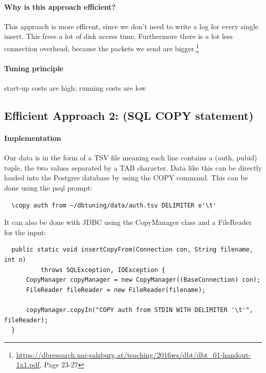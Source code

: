\documentclass[11pt]{scrartcl}
\begin{document}
  \paragraph{Why is this approach efficient?}

  This approach is more efficent, since we don't need to write a log for every single insert. This frees a lot of disk access time. Furthermore there is a lot less connection overhead, because the packets we send are bigger.\footnote{\url{https://dbresearch.uni-salzburg.at/teaching/2016ws/dbt/dbt_01-handout-1x1.pdf}, Page 23-27}

  \paragraph{Tuning principle}

  start-up costs are high; running costs are low

    \subsection*{Efficient Approach 2: (SQL COPY statement)}

  \paragraph{Implementation}

  Our data is in the form of a TSV file meaning each line contains a
  (auth, pubid) tuple, the two values separated by a TAB character. Data like this can be
  directly loaded into the Postgres database by using the COPY command. This can be
  done using the psql prompt:
  
  {\small
\begin{verbatim}
  \copy auth from ~/dbtuning/data/auth.tsv DELIMITER e'\t'
\end{verbatim}
}

It can also be done with JDBC using the CopyManager class and a FileReader
for the input:

{\small
\begin{verbatim}
  public static void insertCopyFrom(Connection con, String filename, int n)
          throws SQLException, IOException {
      CopyManager copyManager = new CopyManager((BaseConnection) con);
      FileReader fileReader = new FileReader(filename);
    
      copyManager.copyIn("COPY auth from STDIN WITH DELIMITER '\t'", fileReader);
  }
\end{verbatim}
}
\end{document}
